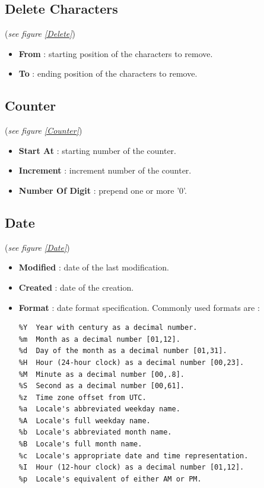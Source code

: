 \documentclass[11pt, a4paper]{scrartcl}
\begin{document}
\subsection*{Delete Characters}
(\emph{see figure \ref{Delete}})\\

\begin{itemize}
        \item \textbf{From} : starting position of the characters to remove.
        \item \textbf{To} : ending position of the characters to remove.
\end{itemize}

\subsection*{Counter}
(\emph{see figure \ref{Counter}})\\

\begin{itemize}
        \item \textbf{Start At} : starting number of the counter. 
        \item \textbf{Increment} : increment number of the counter.
        \item \textbf{Number Of Digit} : prepend one or more '0'.
\end{itemize}

\subsection*{Date}
(\emph{see figure \ref{Date}})\\

\begin{itemize}
        \item \textbf{Modified} : date of the last modification.
        \item \textbf{Created} : date of the creation.
        \item \textbf{Format} : date format specification. Commonly used formats are :
                \begingroup
                \fontsize{8pt}{8pt}\selectfont
\begin{verbatim} 
%Y  Year with century as a decimal number.
%m  Month as a decimal number [01,12].
%d  Day of the month as a decimal number [01,31].
%H  Hour (24-hour clock) as a decimal number [00,23].
%M  Minute as a decimal number [00,.8].
%S  Second as a decimal number [00,61].
%z  Time zone offset from UTC.
%a  Locale's abbreviated weekday name.
%A  Locale's full weekday name.
%b  Locale's abbreviated month name.
%B  Locale's full month name.
%c  Locale's appropriate date and time representation.
%I  Hour (12-hour clock) as a decimal number [01,12].
%p  Locale's equivalent of either AM or PM.
\end{verbatim}
        \endgroup
\end{itemize}
\end{document}
